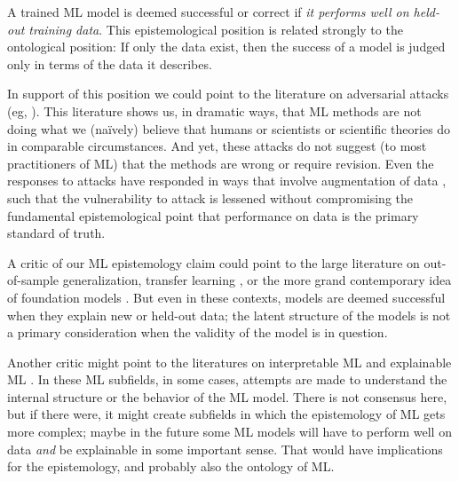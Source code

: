 \documentclass{article}
\begin{document}
A trained ML model is deemed successful or correct if \emph{it performs well on held-out training data}.
This epistemological position is related strongly to the ontological position:
If only the data exist, then the success of a model is judged only in terms of the data it describes.

In support of this position we could point to the literature on adversarial attacks (eg, \citealt{adversarial1}).
This literature shows us, in dramatic ways, that ML methods are not doing what we (na\"ively) believe that humans or scientists or scientific theories do in comparable circumstances.
And yet, these attacks do not suggest (to most practitioners of ML) that the methods are wrong or require revision.
Even the responses to attacks have responded in ways that involve augmentation of data \cite{adversarial_training}, such that the vulnerability to attack is lessened without compromising the fundamental epistemological point that performance on data is the primary standard of truth.

A critic of our ML epistemology claim could point to the large literature on out-of-sample generalization, transfer learning \cite{transfer}, or the more grand contemporary idea of foundation models \cite{foundation}.
But even in these contexts, models are deemed successful when they explain new or held-out data; the latent structure of the models is not a primary consideration when the validity of the model is in question.

Another critic might point to the literatures on interpretable ML \cite{interpretable} and explainable ML \cite{explainable}.
In these ML subfields, in some cases, attempts are made to understand the internal structure or the behavior of the ML model.
There is not consensus here, but if there were, it might create subfields in which the epistemology of ML gets more complex; maybe in the future some ML models will have to perform well on data \emph{and} be explainable in some important sense.
That would have implications for the epistemology, and probably also the ontology of ML.
\end{document}
